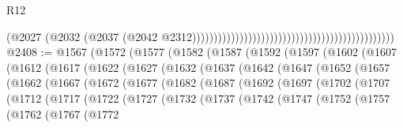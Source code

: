 \begin{lexlean}{R12}
\begin{coremodule}
{{{{{{{{{{{{{{{{{{{{{{{{{{{{{{{{{{{{{{{{{{{{{{{{{{{{{{{{{{{{{{{{{{{{{{{{{{{{{{{{{{{{{{{{{{{{{{{{{{{{{{{{{{                                                                                          (@2027
                                                                                            (@2032
                                                                                              (@2037
                                                                                                (@2042
                                                                                                  @2312)))))))))))))))))))))))))))))))))))))))))))))))
@2408 := @1567
    (@1572
      (@1577
        (@1582
          (@1587
            (@1592
              (@1597
                (@1602
                  (@1607
                    (@1612
                      (@1617
                        (@1622
                          (@1627
                            (@1632
                              (@1637
                                (@1642
                                  (@1647
                                    (@1652
                                      (@1657
                                        (@1662
                                          (@1667
                                            (@1672
                                              (@1677
                                                (@1682
                                                  (@1687
                                                    (@1692
                                                      (@1697
                                                        (@1702
                                                          (@1707
                                                            (@1712
                                                              (@1717
                                                                (@1722
                                                                  (@1727
                                                                    (@1732
                                                                      (@1737
                                                                        (@1742
                                                                          (@1747
                                                                            (@1752
                                                                              (@1757
                                                                                (@1762
                                                                                  (@1767
                                                                                    (@1772
}}}}}}}}}}}}}}}}}}}}}}}}}}}}}}}}}}}}}}}}}}}}}}}}}}}}}}}}}}}}}}}}}}}}}}}}}}}}}}}}}}}}}}}}}}}}}}}}}}}}}}}}}}
\end{coremodule}
\end{lexlean}

